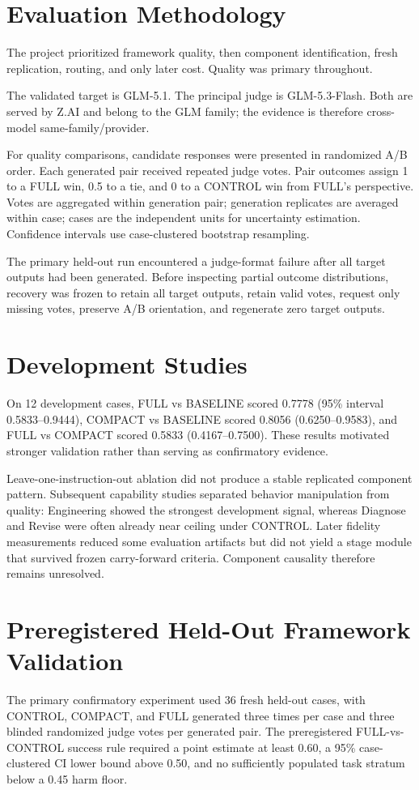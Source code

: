 \documentclass[11pt]{article}
\begin{document}
\section{Evaluation Methodology}
The project prioritized framework quality, then component identification, fresh replication, routing, and only later cost. Quality was primary throughout.

The validated target is GLM-5.1. The principal judge is GLM-5.3-Flash. Both are served by Z.AI and belong to the GLM family; the evidence is therefore cross-model same-family/provider.

For quality comparisons, candidate responses were presented in randomized A/B order. Each generated pair received repeated judge votes. Pair outcomes assign 1 to a FULL win, 0.5 to a tie, and 0 to a CONTROL win from FULL's perspective. Votes are aggregated within generation pair; generation replicates are averaged within case; cases are the independent units for uncertainty estimation. Confidence intervals use case-clustered bootstrap resampling.

The primary held-out run encountered a judge-format failure after all target outputs had been generated. Before inspecting partial outcome distributions, recovery was frozen to retain all target outputs, retain valid votes, request only missing votes, preserve A/B orientation, and regenerate zero target outputs.

\section{Development Studies}
On 12 development cases, FULL vs BASELINE scored 0.7778 (95\% interval 0.5833--0.9444), COMPACT vs BASELINE scored 0.8056 (0.6250--0.9583), and FULL vs COMPACT scored 0.5833 (0.4167--0.7500). These results motivated stronger validation rather than serving as confirmatory evidence.

Leave-one-instruction-out ablation did not produce a stable replicated component pattern. Subsequent capability studies separated behavior manipulation from quality: Engineering showed the strongest development signal, whereas Diagnose and Revise were often already near ceiling under CONTROL. Later fidelity measurements reduced some evaluation artifacts but did not yield a stage module that survived frozen carry-forward criteria. Component causality therefore remains unresolved.

\section{Preregistered Held-Out Framework Validation}
The primary confirmatory experiment used 36 fresh held-out cases, with CONTROL, COMPACT, and FULL generated three times per case and three blinded randomized judge votes per generated pair. The preregistered FULL-vs-CONTROL success rule required a point estimate at least 0.60, a 95\% case-clustered CI lower bound above 0.50, and no sufficiently populated task stratum below a 0.45 harm floor.
\end{document}
